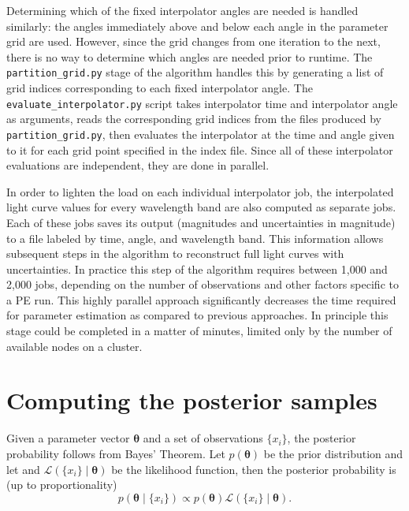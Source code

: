 \documentclass[11pt]{article}
\begin{document}
Determining which of the fixed interpolator angles are needed is handled similarly: the angles immediately above and below each angle in the parameter grid are used. However, since the grid changes from one iteration to the next, there is no way to determine which angles are needed prior to runtime. The \texttt{partition\_grid.py} stage of the algorithm handles this by generating a list of grid indices corresponding to each fixed interpolator angle. The \texttt{evaluate\_interpolator.py} script takes interpolator time and interpolator angle as arguments, reads the corresponding grid indices from the files produced by \texttt{partition\_grid.py}, then evaluates the interpolator at the time and angle given to it for each grid point specified in the index file. Since all of these interpolator evaluations are independent, they are done in parallel.

In order to lighten the load on each individual interpolator job, the interpolated light curve values for every wavelength band are also computed as separate jobs. Each of these jobs saves its output (magnitudes and uncertainties in magnitude) to a file labeled by time, angle, and wavelength band. This information allows subsequent steps in the algorithm to reconstruct full light curves with uncertainties. In practice this step of the algorithm requires between 1,000 and 2,000 jobs, depending on the number of observations and other factors specific to a PE run. This highly parallel approach significantly decreases the time required for parameter estimation as compared to previous approaches. In principle this stage could be completed in a matter of minutes, limited only by the number of available nodes on a cluster.

\section{Computing the posterior samples}

Given a parameter vector $\bm{\theta}$ and a set of observations $\{x_i\}$, the posterior probability follows from Bayes' Theorem. Let $p(\bm{\theta})$ be the prior distribution and let and $\mathcal{L}(\{x_i\} \mid \bm{\theta})$ be the likelihood function, then the posterior probability is (up to proportionality)
\begin{equation} \label{eq:post}
	p (\bm{\theta} \mid \{x_i\}) \propto p(\bm{\theta}) \mathcal{L}(\{x_i\} \mid \bm{\theta}).
\end{equation}
\end{document}
